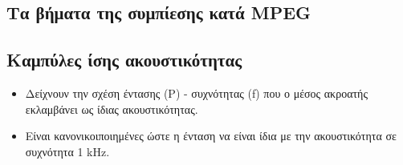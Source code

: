 \documentclass[a4paper,12pt]{article}
\begin{document}
\subsection{Τα βήματα της συμπίεσης κατά MPEG}
\subsection{Καμπύλες ίσης ακουστικότητας}
\begin{itemize}
    \item Δείχνουν την σχέση έντασης (P) - συχνότητας (f) που ο μέσος ακροατής εκλαμβάνει
    ως ίδιας ακουστικότητας.
    \item Είναι κανονικοιποιημένες ώστε η ένταση να είναι ίδια με την ακουστικότητα σε
    συχνότητα 1 kHz.
\end{itemize}
\end{document}
